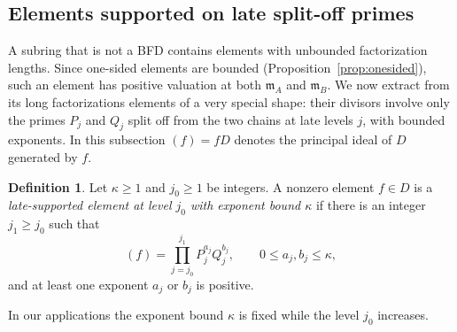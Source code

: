 \documentclass[11pt]{article}
\theoremstyle{plain}
\theoremstyle{definition}
\newtheorem{definition}[theorem]{Definition}
\theoremstyle{remark}
\newcommand{\EA}{\mathfrak m_A}
\newcommand{\EB}{\mathfrak m_B}
\begin{document}
\subsection{Elements supported on late split-off primes}
\label{sec:orders-late}

A subring that is not a BFD contains elements with unbounded
factorization lengths.  Since one-sided elements are bounded
(Proposition~\ref{prop:onesided}), such an element has positive valuation
at both $\EA$ and $\EB$.  We now extract from its long factorizations
elements of a very special shape: their divisors involve only the primes
$P_j$ and $Q_j$ split off from the two chains at late levels $j$, with
bounded exponents.  In this subsection $(f)=fD$ denotes the principal
ideal of $D$ generated by $f$.

\begin{definition}\label{def:late-supported}
Let $\kappa\geq1$ and $j_0\geq1$ be integers.  A nonzero element $f\in D$
is a \emph{late-supported element at level $j_0$ with exponent bound
$\kappa$} if there is an integer $j_1\geq j_0$ such that
\begin{equation}\label{eq:profile}
 (f)=\prod_{j=j_0}^{j_1} P_j^{a_j}Q_j^{b_j},
 \qquad 0\leq a_j,b_j\leq \kappa,
\end{equation}
and at least one exponent $a_j$ or $b_j$ is positive.
\end{definition}

In our applications the exponent bound $\kappa$ is fixed while the level
$j_0$ increases.
\end{document}
